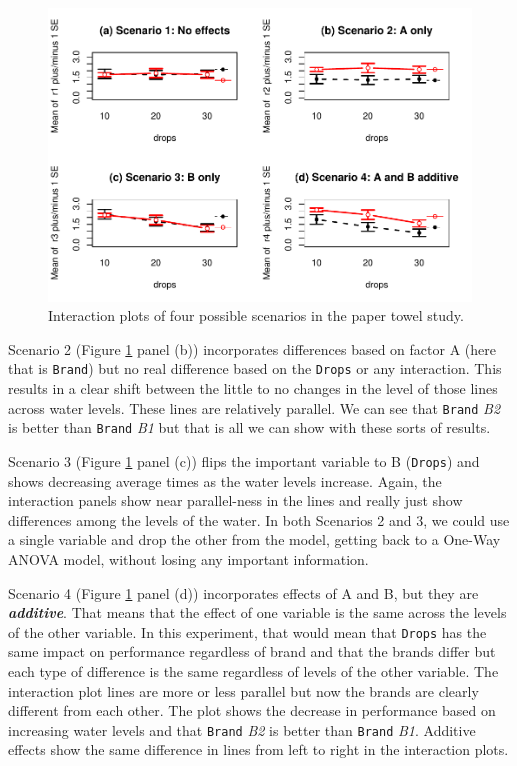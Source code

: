 \documentclass[]{book}
\theoremstyle{definition}
\theoremstyle{definition}
\theoremstyle{remark}
\begin{document}
\begin{figure}
\centering
\includegraphics{04-twoWayAnova_files/figure-latex/Figure4-4-1.pdf}
\caption{\label{fig:Figure4-4}Interaction plots of four possible scenarios in the paper
towel study.}
\end{figure}

Scenario 2 (Figure \ref{fig:Figure4-4} panel (b)) incorporates
differences based on factor A (here that is \texttt{Brand}) but no real
difference based on the \texttt{Drops} or any interaction. This results
in a clear shift between the little to no changes in the level of those
lines across water levels. These lines are relatively parallel. We can
see that \texttt{Brand} \emph{B2} is better than \texttt{Brand}
\emph{B1} but that is all we can show with these sorts of results.

Scenario 3 (Figure \ref{fig:Figure4-4} panel (c)) flips the important
variable to B (\texttt{Drops}) and shows decreasing average times as the
water levels increase. Again, the interaction panels show near
parallel-ness in the lines and really just show differences among the
levels of the water. In both Scenarios 2 and 3, we could use a single
variable and drop the other from the model, getting back to a One-Way
ANOVA model, without losing any important information.

Scenario 4 (Figure \ref{fig:Figure4-4} panel (d)) incorporates effects
of A and B, but they are \textbf{\emph{additive}}. That means that the
effect of one variable is the same across the levels of the other
variable. In this experiment, that would mean that \texttt{Drops} has
the same impact on performance regardless of brand and that the brands
differ but each type of difference is the same regardless of levels of
the other variable. The interaction plot lines are more or less parallel
but now the brands are clearly different from each other. The plot shows
the decrease in performance based on increasing water levels and that
\texttt{Brand} \emph{B2} is better than \texttt{Brand} \emph{B1}.
Additive effects show the same difference in lines from left to right in
the interaction plots.
\end{document}
